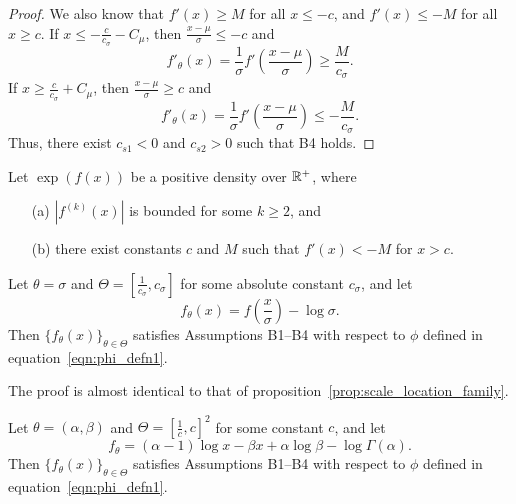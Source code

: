 \documentclass{article}
\begin{document}
\begin{proof}
We also know that $f'(x) \geq M$ for all $x \leq -c$, and $f'(x) \leq -M$ for all $x \geq c$. If $x \leq - \frac{c}{c_\sigma} - C_\mu$, then $\frac{x - \mu}{\sigma} \leq -c$ and
\[
f'_\theta(x) = \frac{1}{\sigma} f'\left( \frac{x - \mu}{\sigma} \right) \geq \frac{M}{c_\sigma}.
\]
If $x \geq \frac{c}{c_\sigma} + C_\mu$, then $\frac{x - \mu}{\sigma} \geq c$ and
\[
f'_\theta(x) = \frac{1}{\sigma} f'\left( \frac{x - \mu}{\sigma} \right) \leq -\frac{M}{c_\sigma}.
\]
Thus, there exist $c_{s1} < 0$ and $c_{s2} > 0$ such that B4 holds. 

\end{proof}

\begin{proposition}
\label{prop:scale_family}
Let $\exp( f(x))$ be a positive density over ${\mathbb R}^+$, where
\begin{itemize}
\item[(a)] $|f^{(k)}(x)|$ is bounded for some $k \geq 2$, and
\item[(b)] there exist constants $c$ and $M$ such that $f'(x) < - M$ for $x > c$.
\end{itemize}
Let $\theta = \sigma$ and $\Theta = [\frac{1}{c_{\sigma}}, c_{\sigma}]$ for some absolute constant $c_{\sigma}$, and let
\[
f_\theta (x) = f\left( \frac{x}{\sigma} \right) - \log \sigma.
\]
Then $\{ f_\theta(x) \}_{\theta \in \Theta}$ satisfies Assumptions B1--B4 with respect to $\phi$ defined in equation~\eqref{eqn:phi_defn1}.
\end{proposition}

The proof is almost identical to that of proposition~\ref{prop:scale_location_family}. 

\begin{proposition}
\label{prop:gamma_family}

Let $\theta = (\alpha, \beta)$ and $\Theta = [\frac{1}{c}, c]^2$ for some constant $c$, and let
$$
f_{\theta} = (\alpha - 1) \log x - \beta x + \alpha \log \beta - \log \Gamma(\alpha).
$$
Then  $\{ f_{\theta}(x) \}_{\theta \in \Theta}$ satisfies Assumptions B1--B4 with respect to $\phi$ defined in equation~\eqref{eqn:phi_defn1}.
\end{proposition}
\end{document}
